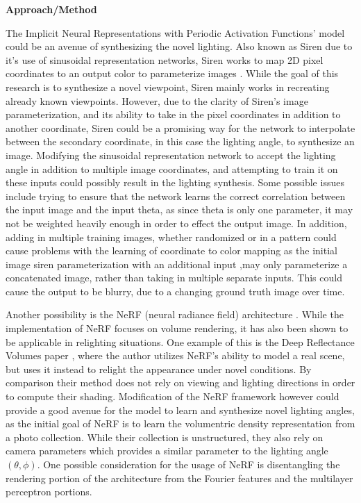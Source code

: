 \documentclass[12pt,twoside]{article}
\begin{document}
	\noindent\textbf{Approach/Method}
	
	The Implicit Neural Representations with Periodic Activation Functions' model could be an avenue of synthesizing the novel lighting.  Also known as Siren due to it's use of sinusoidal representation networks, Siren works to map 2D pixel coordinates to an output color to parameterize images \cite{sitzmann2020implicit}. While the goal of this research is to synthesize a novel viewpoint, Siren mainly works in recreating already known viewpoints. However, due to the clarity of Siren's image parameterization, and its ability to take in the pixel coordinates in addition to another coordinate, Siren could be a promising way for the network to interpolate between the secondary coordinate, in this case the lighting angle, to synthesize an image. Modifying the sinusoidal representation network to accept the lighting angle in addition to multiple image coordinates, and attempting to train it on these inputs could possibly result in the lighting synthesis. Some possible issues include trying to ensure that the network learns the correct correlation between the input image and the input theta, as since theta is only one parameter, it may not be weighted heavily enough in order to effect the output image. In addition, adding in multiple training images, whether randomized or in a pattern could cause problems with the learning of coordinate to color mapping as the initial image siren parameterization with an additional input ,may only parameterize a concatenated image, rather than taking in multiple separate inputs. This could cause the output to be blurry, due to a changing ground truth image over time.
	
	Another possibility is the NeRF (neural radiance field) architecture \cite{martinbrualla2021nerf}. While the implementation of NeRF focuses on volume rendering, it has also been shown to be applicable in relighting situations. One example of this is the Deep Reflectance Volumes paper \cite{bi2020neural}, where the author utilizes NeRF's ability to model a real scene, but uses it instead to relight the appearance under novel conditions. By comparison their method does not rely on viewing and lighting directions in order to compute their shading. Modification of the NeRF framework however could provide a good avenue for the model to learn and synthesize novel lighting angles, as the initial goal of NeRF is to learn the volumentric density representation from a photo collection. While their collection is unstructured, they also rely on camera parameters which provides a similar parameter to the lighting angle  $(\theta, \phi)$. One possible consideration for the usage of NeRF is disentangling the rendering portion of the architecture from the Fourier features and the multilayer perceptron portions. 
	
\end{document}
